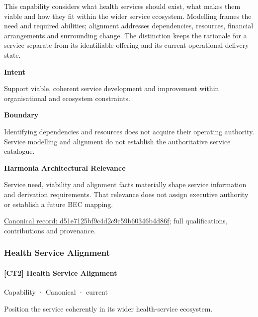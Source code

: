 This capability considers what health services should exist, what makes them viable and how they fit within the wider service ecosystem. Modelling frames the need and required abilities; alignment addresses dependencies, resources, financial arrangements and surrounding change. The distinction keeps the rationale for a service separate from its identifiable offering and its current operational delivery state.



\textbf{Intent}



Support viable, coherent service development and improvement within organisational and ecosystem constraints.



\textbf{Boundary}



Identifying dependencies and resources does not acquire their operating authority. Service modelling and alignment do not establish the authoritative service catalogue.



\textbf{Harmonia Architectural Relevance}



Service need, viability and alignment facts materially shape service information and derivation requirements. That relevance does not assign executive authority or establish a future BEC mapping.


{\footnotesize \href{../../../../continuum/strategy/capability/d51e7125bf9c4d2c9c59b60346b4d86f.md}{Canonical record: d51e7125bf9c4d2c9c59b60346b4d86f}; full qualifications, contributions and provenance.}\par
\subsubsection{Health Service Alignment}

\paragraph{[CT2] Health Service Alignment}

\label{element:d4fc5367352741a99bd334f7e8bf5856}
{\small Capability · Canonical · current}\par

Position the service coherently in its wider health-service ecosystem.



